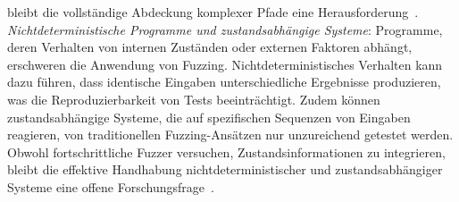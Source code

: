 bleibt die vollständige Abdeckung komplexer Pfade eine Herausforderung~\cite{noller_badger_2018}.\newline
\textit{ Nichtdeterministische Programme und zustandsabhängige Systeme}:
Programme, deren Verhalten von internen Zuständen oder externen Faktoren abhängt, erschweren die Anwendung von Fuzzing.
Nichtdeterministisches Verhalten kann dazu führen, dass identische Eingaben unterschiedliche Ergebnisse produzieren, was
die Reproduzierbarkeit von Tests beeinträchtigt.
Zudem können zustandsabhängige Systeme, die auf spezifischen Sequenzen von Eingaben reagieren, von traditionellen
Fuzzing-Ansätzen nur unzureichend getestet werden.
Obwohl fortschrittliche Fuzzer versuchen, Zustandsinformationen zu integrieren, bleibt die effektive Handhabung
nichtdeterministischer und zustandsabhängiger Systeme eine offene Forschungsfrage~\cite{she_fox_2024,pham_aflnet_2020}.


